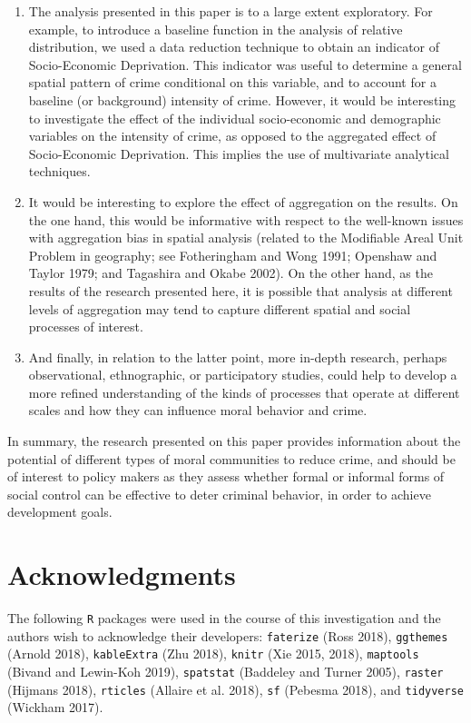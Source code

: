\documentclass[smallextended]{svjour3}       %
\begin{document}
\begin{enumerate}
\def\labelenumi{\arabic{enumi}.}
\item
  The analysis presented in this paper is to a large extent exploratory.
  For example, to introduce a baseline function in the analysis of
  relative distribution, we used a data reduction technique to obtain an
  indicator of Socio-Economic Deprivation. This indicator was useful to
  determine a general spatial pattern of crime conditional on this
  variable, and to account for a baseline (or background) intensity of
  crime. However, it would be interesting to investigate the effect of
  the individual socio-economic and demographic variables on the
  intensity of crime, as opposed to the aggregated effect of
  Socio-Economic Deprivation. This implies the use of multivariate
  analytical techniques.
\item
  It would be interesting to explore the effect of aggregation on the
  results. On the one hand, this would be informative with respect to
  the well-known issues with aggregation bias in spatial analysis
  (related to the Modifiable Areal Unit Problem in geography; see
  Fotheringham and Wong 1991; Openshaw and Taylor 1979; and Tagashira
  and Okabe 2002). On the other hand, as the results of the research
  presented here, it is possible that analysis at different levels of
  aggregation may tend to capture different spatial and social processes
  of interest.
\item
  And finally, in relation to the latter point, more in-depth research,
  perhaps observational, ethnographic, or participatory studies, could
  help to develop a more refined understanding of the kinds of processes
  that operate at different scales and how they can influence moral
  behavior and crime.
\end{enumerate}

In summary, the research presented on this paper provides information
about the potential of different types of moral communities to reduce
crime, and should be of interest to policy makers as they assess whether
formal or informal forms of social control can be effective to deter
criminal behavior, in order to achieve development goals.

\hypertarget{acknowledgments}{%
\section{Acknowledgments}\label{acknowledgments}}

The following \texttt{R} packages were used in the course of this
investigation and the authors wish to acknowledge their developers:
\texttt{faterize} (Ross 2018), \texttt{ggthemes} (Arnold 2018),
\texttt{kableExtra} (Zhu 2018), \texttt{knitr} (Xie 2015, 2018),
\texttt{maptools} (Bivand and Lewin-Koh 2019), \texttt{spatstat}
(Baddeley and Turner 2005), \texttt{raster} (Hijmans 2018),
\texttt{rticles} (Allaire et al. 2018), \texttt{sf} (Pebesma 2018), and
\texttt{tidyverse} (Wickham 2017).
\end{document}
